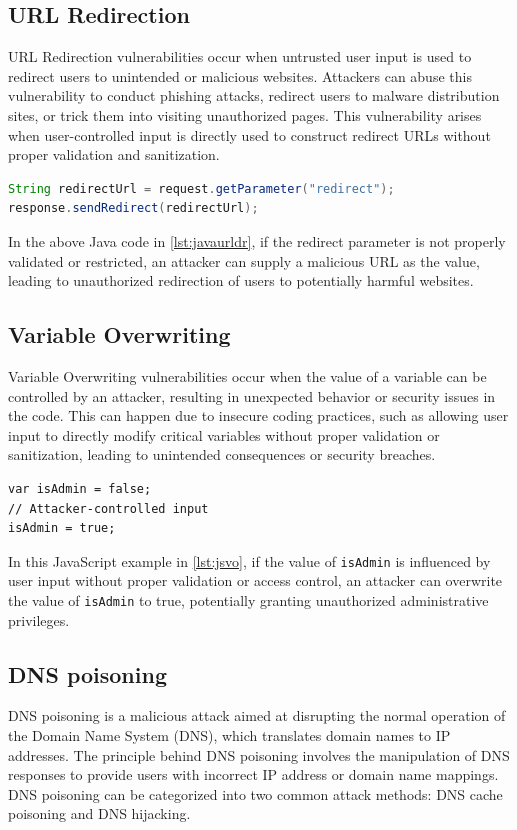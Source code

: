 \documentclass[journal]{IEEEtran}
\begin{document}
\subsection{URL Redirection}
URL Redirection vulnerabilities occur when untrusted user input is used to redirect users to unintended or malicious websites. Attackers can abuse this vulnerability to conduct phishing attacks, redirect users to malware distribution sites, or trick them into visiting unauthorized pages. This vulnerability arises when user-controlled input is directly used to construct redirect URLs without proper validation and sanitization.

\begin{lstlisting}[caption={Java URL Redirection},label={lst:javaurldr},language=JAVA,breaklines=true]
String redirectUrl = request.getParameter("redirect");
response.sendRedirect(redirectUrl);
\end{lstlisting}

In the above Java code in \ref{lst:javaurldr}, if the redirect parameter is not properly validated or restricted, an attacker can supply a malicious URL as the value, leading to unauthorized redirection of users to potentially harmful websites.

\subsection{Variable Overwriting}
Variable Overwriting vulnerabilities occur when the value of a variable can be controlled by an attacker, resulting in unexpected behavior or security issues in the code. This can happen due to insecure coding practices, such as allowing user input to directly modify critical variables without proper validation or sanitization, leading to unintended consequences or security breaches.

\begin{lstlisting}[caption={JavaScript Variable Overwriting},label={lst:jsvo},language=HTML,breaklines=true]
var isAdmin = false;
// Attacker-controlled input
isAdmin = true;
\end{lstlisting}

In this JavaScript example in \ref{lst:jsvo}, if the value of \verb|isAdmin| is influenced by user input without proper validation or access control, an attacker can overwrite the value of \verb|isAdmin| to true, potentially granting unauthorized administrative privileges.

\subsection{DNS poisoning}
DNS poisoning is a malicious attack aimed at disrupting the normal operation of the Domain Name System (DNS), which translates domain names to IP addresses. The principle behind DNS poisoning involves the manipulation of DNS responses to provide users with incorrect IP address or domain name mappings.
DNS poisoning can be categorized into two common attack methods: DNS cache poisoning and DNS hijacking.
\end{document}

